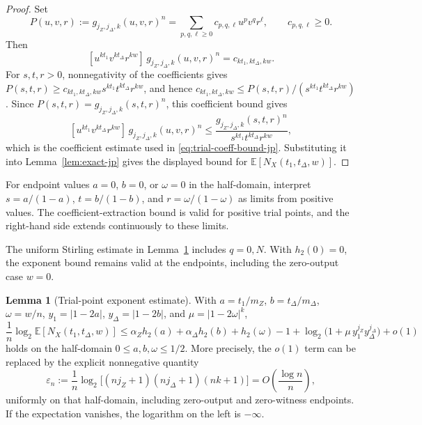 \documentclass[11pt]{article}
\theoremstyle{definition}
\newtheorem{lemma}[theorem]{Lemma}
\newcommand{\EE}{\mathbb E}
\newcommand{\h}{h_2}
\newcommand{\NX}{N_X}
\begin{document}
\begin{proof}
Set
\[
P(u,v,r):=g_{j_Z,j_\Delta,k}(u,v,r)^n
=\sum_{p,q,\ell\ge 0} c_{p,q,\ell}u^p v^q r^\ell,
\qquad c_{p,q,\ell}\ge 0.
\]
Then
\[
[u^{kt_1}v^{kt_\Delta}r^{kw}]\,g_{j_Z,j_\Delta,k}(u,v,r)^n
=c_{kt_1,kt_\Delta,kw}.
\]
For \(s,t,r>0\), nonnegativity of the coefficients gives
\(P(s,t,r)\ge c_{kt_1,kt_\Delta,kw}s^{kt_1}t^{kt_\Delta}r^{kw}\), and hence
\(c_{kt_1,kt_\Delta,kw}\le P(s,t,r)/(s^{kt_1}t^{kt_\Delta}r^{kw})\).
Since \(P(s,t,r)=g_{j_Z,j_\Delta,k}(s,t,r)^n\), this coefficient bound gives
\[
[u^{kt_1}v^{kt_\Delta}r^{kw}]\,g_{j_Z,j_\Delta,k}(u,v,r)^n\le \frac{g_{j_Z,j_\Delta,k}(s,t,r)^n}{s^{kt_1}t^{kt_\Delta}r^{kw}},
\]
which is the coefficient estimate used in \eqref{eq:trial-coeff-bound-jp}. Substituting it into Lemma~\ref{lem:exact-jp} gives the displayed bound for \(\EE[\NX(t_1,t_\Delta,w)]\).
\end{proof}

For endpoint values \(a=0\), \(b=0\), or \(\omega=0\) in the half-domain, interpret \(s=a/(1-a)\), \(t=b/(1-b)\), and \(r=\omega/(1-\omega)\) as limits from positive values. The coefficient-extraction bound is valid for positive trial points, and the right-hand side extends continuously to these limits.

The uniform Stirling estimate in Lemma~\ref{lem:trial-exp-jp} includes \(q=0,N\). With \(\h(0)=0\), the exponent bound remains valid at the endpoints, including the zero-output case \(w=0\).

\begin{lemma}[Trial-point exponent estimate]\label{lem:trial-exp-jp}
With \(a=t_1/m_Z\), \(b=t_\Delta/m_\Delta\), \(\omega=w/n\), \(y_1=|1-2a|\), \(y_\Delta=|1-2b|\), and \(\mu=|1-2\omega|^k\),
\begin{equation}\label{eq:trial-jp}
\frac1n\log_2 \EE[\NX(t_1,t_\Delta,w)]
\le
\alpha_Z\h(a)+\alpha_\Delta\h(b)+\h(\omega)-1
+\log_2\!\bigl(1+\mu\, y_1^{j_Z}y_\Delta^{j_\Delta}\bigr)+o(1)
\end{equation}
holds on the half-domain \(0\le a,b,\omega\le 1/2\). More precisely,
the \(o(1)\) term can be replaced by the explicit nonnegative quantity
\[
\varepsilon_n:=\frac1n\log_2\bigl[(nj_Z+1)(nj_\Delta+1)(nk+1)\bigr]
=O\!\left(\frac{\log n}{n}\right),
\]
uniformly on that half-domain, including zero-output and zero-witness
endpoints. If the expectation vanishes, the logarithm on the left is
\(-\infty\).
\end{lemma}
\end{document}
